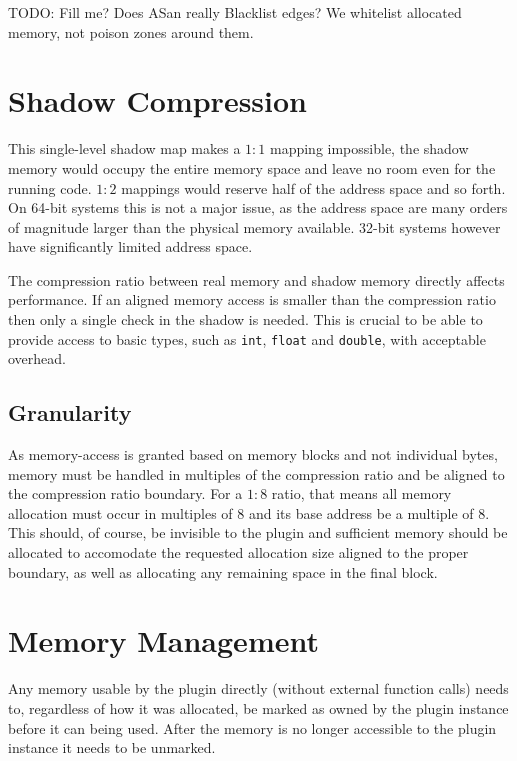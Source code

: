 TODO: Fill me? Does ASan really Blacklist edges? We whitelist allocated memory,
not poison zones around them.


\section {Shadow Compression}

This single-level shadow map makes a $1:1$ mapping impossible, the shadow memory
would occupy the entire memory space and leave no room even for the running
code. $1:2$ mappings would reserve half of the address space and so forth. On
64-bit systems this is not a major issue, as the address space are many orders
of magnitude larger than the physical memory available. 32-bit systems however
have significantly limited address space.

The compression ratio between real memory and shadow memory directly affects
performance. If an aligned memory access is smaller than the compression ratio
then only a single check in the shadow is needed. This is crucial to be able to
provide access to basic types, such as \texttt{int}, \texttt{float} and
\texttt{double}, with acceptable overhead.

\subsection {Granularity}

As memory-access is granted based on memory blocks and not individual bytes,
memory must be handled in multiples of the compression ratio and be aligned to
the compression ratio boundary. For a $1:8$ ratio, that means all memory
allocation must occur in multiples of $8$ and its base address be a multiple of
$8$. This should, of course, be invisible to the plugin and sufficient memory
should be allocated to accomodate the requested allocation size aligned to the
proper boundary, as well as allocating any remaining space in the final block.


\section {Memory Management}

Any memory usable by the plugin directly (without external function calls) needs
to, regardless of how it was allocated, be marked as owned by the plugin
instance before it can being used. After the memory is no longer accessible to
the plugin instance it needs to be unmarked.


